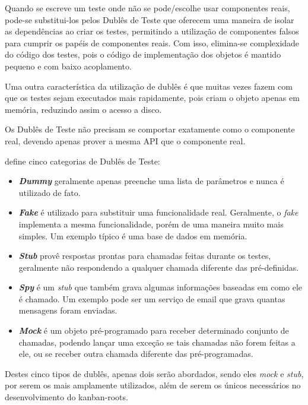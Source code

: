 Quando se escreve um teste onde não se pode/escolhe usar componentes reais, pode-se substitui-los pelos Dublês de Teste que oferecem uma maneira de isolar as dependências ao criar os testes, permitindo a utilização de componentes falsos para cumprir os papéis de componentes reais. Com isso, elimina-se complexidade do código dos testes, pois o código de implementação dos objetos é mantido pequeno e com baixo acoplamento.

Uma outra característica da utilização de dublês é que muitas vezes fazem com que os testes sejam executados mais rapidamente, pois criam o objeto apenas em memória, reduzindo assim o acesso a disco.

Os Dublês de Teste não precisam se comportar exatamente como o componente real, devendo apenas prover a mesma API que o componente real.

 define cinco categorias de Dublês de Teste:

\begin{itemize}
\item
\textbf{\textit{Dummy}} geralmente apenas preenche uma lista de parâmetros e nunca é utilizado de fato.

\item
\textbf{\textit{Fake}} é utilizado para substituir uma funcionalidade real. Geralmente, o \textit{fake} implementa a mesma funcionalidade, porém de uma maneira muito mais simples. Um exemplo típico é uma base de dados em memória.

\item
\textbf{\textit{Stub}} provê respostas prontas para chamadas feitas durante os testes, geralmente não respondendo a qualquer chamada diferente
das pré-definidas.

\item
\textbf{\textit{Spy}} é um \textit{stub} que também grava algumas informações baseadas em como ele é chamado. Um exemplo pode ser um serviço de email que grava quantas mensagens foram enviadas.

\item
\textbf{\textit{Mock}} é um objeto pré-programado para receber determinado conjunto de chamadas, podendo lançar uma exceção se tais chamadas não forem feitas a ele, ou se receber outra chamada diferente das pré-programadas.

\end{itemize}

Destes cinco tipos de dublês, apenas dois serão abordados, sendo eles \textit{mock} e \textit{stub}, por serem os mais amplamente utilizados, além de serem os únicos necessários no desenvolvimento do kanban-roots.